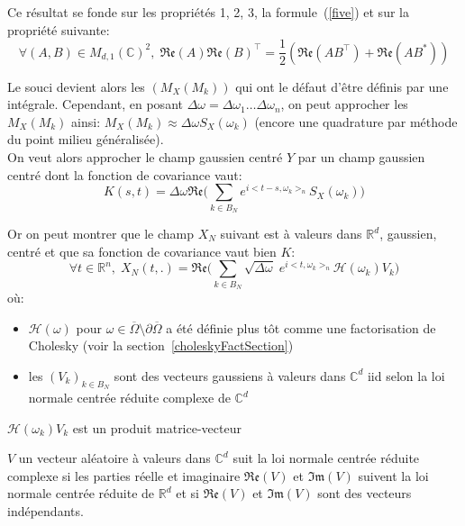 \noindent Ce résultat se fonde sur les propriétés 1, 2, 3, la formule~(\ref{five}) et sur la propriété suivante:
\begin{equation*}
\forall (A,B) \in M_{d,1}(\mathbb{C})^2, \; \mathfrak{Re}(A)\mathfrak{Re}(B)^{\top} = \frac{1}{2}(\mathfrak{Re}(AB^{\top}) + \mathfrak{Re}(AB^{*}))
\end{equation*}

\noindent Le souci devient alors les $(M_X(M_k))$ qui ont le défaut d'être définis par une intégrale. Cependant, en posant $\Delta\omega = \Delta\omega_1 \dots \Delta\omega_n$, on peut approcher les $M_X(M_k)$ ainsi: $ M_X(M_k) \approx \Delta\omega S_X(\omega_k)$ (encore une quadrature par méthode du point milieu généralisée).\\

On veut alors approcher le champ gaussien centré $Y$ par un champ gaussien centré dont la fonction de covariance vaut:
\begin{equation}
  K(s,t) = \Delta\omega \mathfrak{Re}\biggl(\displaystyle\sum_{k \in B_N} e^{i<t-s,\omega_k>_n}S_X(\omega_k)\biggr)
\end{equation}

 
\noindent Or on peut montrer que le champ $X_N$ suivant est à valeurs dans $\mathbb{R}^d$, gaussien, centré et que sa fonction de covariance vaut bien $K$:
\begin{equation}
  \forall t \in \mathbb{R}^n,\; X_N(t,.) = \mathfrak{Re}\biggl(\displaystyle\sum_{k \in B_N} \sqrt{\Delta\omega} \; e^{i<t,\omega_k>_{n}}\mathcal{H}(\omega_k)V_k \biggl) \label{formuleAppro}
\end{equation}
\noindent où:
\begin{itemize}
\item $\mathcal{H}(\omega)$ pour $\omega \in \overline{\Omega} \setminus \partial\overline{\Omega}$ a été définie plus tôt comme une factorisation de Cholesky (voir la section~\ref{choleskyFactSection})

\item les $(V_k)_{k \in B_N}$ sont des vecteurs gaussiens à valeurs dans $\mathbb{C}^d$ iid selon la loi normale centrée réduite complexe de $\mathbb{C}^d$ \\
\end{itemize}

\begin{remark}
  $\mathcal{H}(\omega_k)V_k $ est un produit matrice-vecteur
\end{remark}

\begin{remark}
\noindent $V$ un vecteur aléatoire à valeurs dans $\mathbb{C}^d$ suit la loi normale centrée réduite complexe si les parties réelle et imaginaire $\mathfrak{Re}(V)$ et $\mathfrak{Im}(V)$ suivent la loi normale centrée réduite de $\mathbb{R}^d$ et si $\mathfrak{Re}(V)$ et $\mathfrak{Im}(V)$ sont des vecteurs indépendants.
\end{remark}

